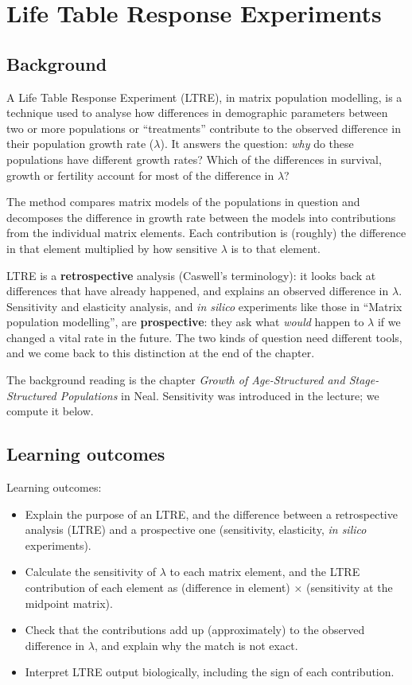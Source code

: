 \documentclass[
  a4paper]{book}
\providecommand{\tightlist}{%
  \setlength{\itemsep}{0pt}\setlength{\parskip}{0pt}}
\begin{document}
\chapter{Life Table Response Experiments}\label{life-table-response-experiments}

\section{Background}\label{background-10}

A Life Table Response Experiment (LTRE), in matrix population modelling, is a technique used to analyse how differences in demographic parameters between two or more populations or ``treatments'' contribute to the observed difference in their population growth rate (\(\lambda\)). It answers the question: \emph{why} do these populations have different growth rates? Which of the differences in survival, growth or fertility account for most of the difference in \(\lambda\)?

The method compares matrix models of the populations in question and decomposes the difference in growth rate between the models into contributions from the individual matrix elements. Each contribution is (roughly) the difference in that element multiplied by how sensitive \(\lambda\) is to that element.

LTRE is a \textbf{retrospective} analysis (Caswell's terminology): it looks back at differences that have already happened, and explains an observed difference in \(\lambda\). Sensitivity and elasticity analysis, and \emph{in silico} experiments like those in ``Matrix population modelling'', are \textbf{prospective}: they ask what \emph{would} happen to \(\lambda\) if we changed a vital rate in the future. The two kinds of question need different tools, and we come back to this distinction at the end of the chapter.

The background reading is the chapter \emph{Growth of Age-Structured and Stage-Structured Populations} in Neal. Sensitivity was introduced in the lecture; we compute it below.

\section{Learning outcomes}\label{learning-outcomes-3}

Learning outcomes:

\begin{itemize}
\tightlist
\item
  Explain the purpose of an LTRE, and the difference between a retrospective analysis (LTRE) and a prospective one (sensitivity, elasticity, \emph{in silico} experiments).
\item
  Calculate the sensitivity of \(\lambda\) to each matrix element, and the LTRE contribution of each element as (difference in element) × (sensitivity at the midpoint matrix).
\item
  Check that the contributions add up (approximately) to the observed difference in \(\lambda\), and explain why the match is not exact.
\item
  Interpret LTRE output biologically, including the sign of each contribution.
\end{itemize}
\end{document}
